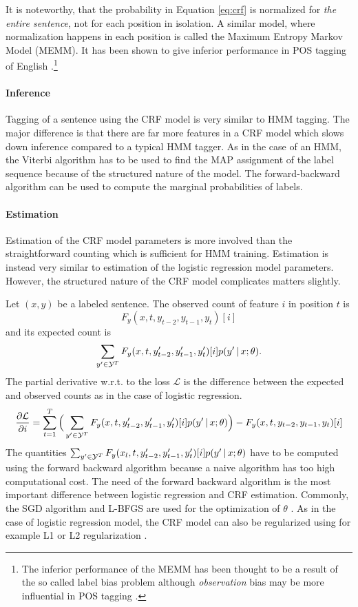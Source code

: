 It is noteworthy, that the probability in Equation \ref{eq:crf} is
normalized for {\it the entire sentence}, not for each position in
isolation. A similar model, where normalization happens in each
position is called the Maximum Entropy Markov Model (MEMM). It has
been shown to give inferior performance in POS tagging of English
\citep{Lafferty2001}.\footnote{The inferior performance of the MEMM
  has been thought to be a result of the so called label bias problem
  \citep{Lafferty2001} although {\it observation} bias may be more
  influential in POS tagging \citep{Klein2002}.}

\paragraph{Inference} Tagging of a sentence using the CRF model is
very similar to HMM tagging. The major difference is that there are
far more features in a CRF model which slows down inference compared
to a typical HMM tagger. As in the case of an HMM, the Viterbi
algorithm has to be used to find the MAP assignment of the label
sequence because of the structured nature of the model. The
forward-backward algorithm can be used to compute the marginal
probabilities of labels.

\paragraph{Estimation} Estimation of the CRF model parameters is more
involved than the straightforward counting which is sufficient for HMM
training. Estimation is instead very similar to estimation of the
logistic regression model parameters. However, the structured nature
of the CRF model complicates matters slightly.

Let $(x, y)$ be a labeled sentence. The observed count of feature $i$ in position $t$ is 
$$F_{y}(x, t, y_{t-2},y_{t-1},y_t)[i]$$ 
and its expected count is
$$\sum_{y' \in \mathcal{Y}^T} F_y(x, t, y_{t - 2}', y_{t-1}', y_t')[i] p(y'\mbox{$ \, | \, $} x \mbox{$ ; \, $} \theta).$$
The partial derivative w.r.t. to the loss $\mathcal{L}$ is the difference between the expected and observed counts as in the case of logistic regression.
$$\frac{\partial\mathcal{L}}{\partial i} = \sum_{t=1}^T \Big( \sum_{y' \in \mathcal{Y}^T} F_y(x, t, y_{t - 2}', y_{t-1}', y_t')[i] p(y'\mbox{$ \, | \, $} x \mbox{$ ; \, $} \theta)\Big) - F_{y}(x, t, y_{t-2},y_{t-1},y_t)[i]$$ 
The quantities $\sum_{y' \in \mathcal{Y}^T} F_y(x_l, t, y_{t - 2}',
y_{t-1}', y_t')[i] p(y'\mbox{$ \, | \, $} x \mbox{$ ; \, $} \theta)$ have to be computed using
the forward backward algorithm because a naive algorithm has too high computational cost. The need of the forward backward algorithm is the
most important difference between logistic regression and CRF estimation.  Commonly,
the SGD algorithm and L-BFGS are used for the optimization of $\theta$
\citep{Vishwanathan2006}. As in the case of logistic regression model, the CRF model
can also be regularized using for example L1 or L2 regularization
\citep{Sutton2012}.

